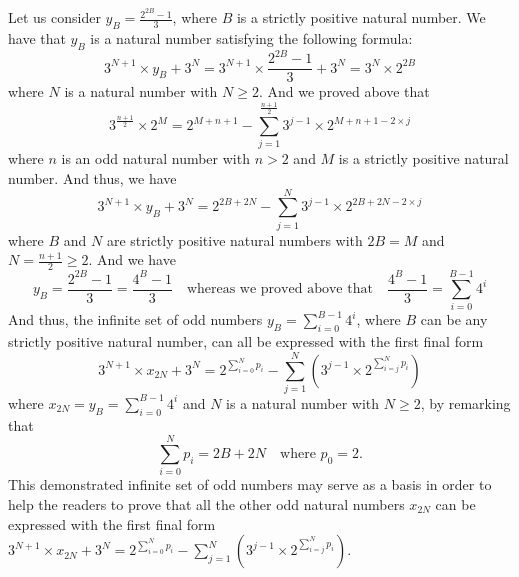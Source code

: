 \documentclass[11pt,a4paper]{article}
\newcommand{\Pf}[4]{2^{\sum_{#4=0}^{#1}#3_{#4}}-\sum_{j=1}^{#2}\left(3^{j-1}\times 2^{\sum_{#4=j}^{#1}#3_{#4}}\right)}
\theoremstyle{definition}
\begin{document}
Let us consider $y_B=\frac{2^{2B}-1}{3}$, where $B$ is a strictly positive natural number.
We have that $y_B$ is a natural number satisfying the following formula:
\begin{equation}
3^{N+1}\times y_B+3^{N}=3^{N+1}\times\frac{2^{2B}-1}{3}+3^{N}=3^{N}\times 2^{2B}
\end{equation}
where $N$ is a natural number with $N\ge 2$. And we proved above that
\begin{equation}
3^{\frac{n+1}{2}}\times 2^{M}=2^{M+n+1}-\sum_{j=1}^{\frac{n+1}{2}}3^{j-1}\times 2^{M+n+1-2\times j}
\end{equation}
where $n$ is an odd natural number with $n>2$ and $M$ is a strictly positive natural number.
And thus, we have
\begin{equation}
3^{N+1}\times y_B+3^{N}=2^{2B+2N}-\sum_{j=1}^{N}3^{j-1}\times 2^{2B+2N-2\times j}
\end{equation}
where $B$ and $N$ are strictly positive natural numbers with $2B=M$ and
$N=\frac{n+1}{2}\ge 2$. And we have
\begin{equation}
y_B=\frac{2^{2B}-1}{3}=\frac{4^{B}-1}{3}\quad\text{whereas we proved above that}\quad
\frac{4^{B}-1}{3}=\sum_{i=0}^{B-1}4^{i}
\end{equation}
And thus, the infinite set of odd numbers $y_B=\sum_{i=0}^{B-1}4^{i}$, where $B$ can be any
strictly positive natural number, can all be expressed with the first final form
\begin{equation}
3^{N+1}\times x_{2N}+3^{N}=\Pf{N}{N}{p}{i}
\end{equation}
where $x_{2N}=y_B=\sum_{i=0}^{B-1}4^{i}$ and $N$ is a natural number with $N\ge 2$, by
remarking that
\begin{equation}
\sum_{i=0}^{N}p_i=2B+2N\quad\text{where }p_0=2.
\end{equation}
This demonstrated infinite set of odd numbers may serve as a basis in order to help the
readers to prove that all the other odd natural numbers $x_{2N}$ can be expressed with the
first final form $3^{N+1}\times x_{2N}+3^{N}=\Pf{N}{N}{p}{i}$.
\end{document}
